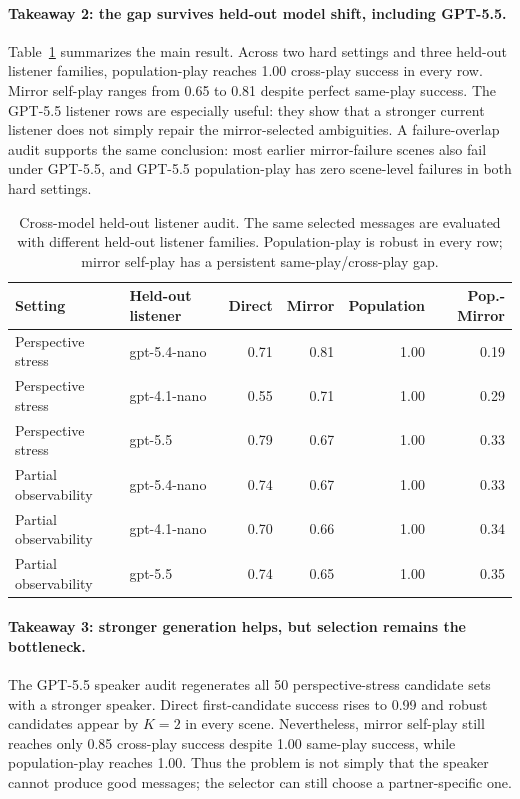 \documentclass{article}
\begin{document}
\paragraph{Takeaway 2: the gap survives held-out model shift, including GPT-5.5.}
Table~\ref{tab:crossmodel} summarizes the main result. Across two hard settings and three held-out listener families, population-play reaches 1.00 cross-play success in every row. Mirror self-play ranges from 0.65 to 0.81 despite perfect same-play success. The GPT-5.5 listener rows are especially useful: they show that a stronger current listener does not simply repair the mirror-selected ambiguities. A failure-overlap audit supports the same conclusion: most earlier mirror-failure scenes also fail under GPT-5.5, and GPT-5.5 population-play has zero scene-level failures in both hard settings.

\begin{table}[t]
\centering
\small
\begin{tabular}{llrrrr}
\toprule
Setting & Held-out listener & Direct & Mirror & Population & Pop.-Mirror \\
\midrule
Perspective stress & gpt-5.4-nano & 0.71 & 0.81 & 1.00 & 0.19 \\
Perspective stress & gpt-4.1-nano & 0.55 & 0.71 & 1.00 & 0.29 \\
Perspective stress & gpt-5.5 & 0.79 & 0.67 & 1.00 & 0.33 \\
Partial observability & gpt-5.4-nano & 0.74 & 0.67 & 1.00 & 0.33 \\
Partial observability & gpt-4.1-nano & 0.70 & 0.66 & 1.00 & 0.34 \\
Partial observability & gpt-5.5 & 0.74 & 0.65 & 1.00 & 0.35 \\
\bottomrule
\end{tabular}
\caption{Cross-model held-out listener audit. The same selected messages are evaluated with different held-out listener families. Population-play is robust in every row; mirror self-play has a persistent same-play/cross-play gap.}
\label{tab:crossmodel}
\end{table}

\paragraph{Takeaway 3: stronger generation helps, but selection remains the bottleneck.}
The GPT-5.5 speaker audit regenerates all 50 perspective-stress candidate sets with a stronger speaker. Direct first-candidate success rises to 0.99 and robust candidates appear by $K=2$ in every scene. Nevertheless, mirror self-play still reaches only 0.85 cross-play success despite 1.00 same-play success, while population-play reaches 1.00. Thus the problem is not simply that the speaker cannot produce good messages; the selector can still choose a partner-specific one.
\end{document}
